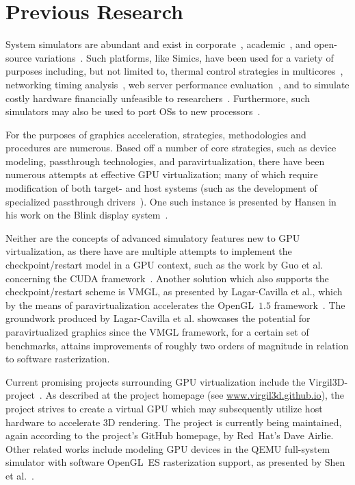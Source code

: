 
\section{Previous Research}
\label{sec:previousresearch}

System simulators are abundant and exist in corporate~, academic~, and open-source variations~.
Such platforms, like Simics, have been used for a variety of purposes including, but not limited to, thermal control strategies in multicores~, networking timing analysis~, web server performance evaluation~, and to simulate costly hardware financially unfeasible to researchers~.
Furthermore, such simulators may also be used to port OSs to new processors~.

For the purposes of graphics acceleration, strategies, methodologies and procedures are numerous.
Based off a number of core strategies, such as device modeling, passthrough technologies, and paravirtualization, there have been numerous attempts at effective GPU virtualization; many of which require modification of both target- and host systems (such as the development of specialized passthrough drivers~).
One such instance is presented by Hansen in his work on the Blink display system~.

Neither are the concepts of advanced simulatory features new to GPU virtualization, as there have are multiple attempts to implement the checkpoint/restart model in a GPU context, such as the work by Guo et al. concerning the CUDA framework~.
Another solution which also supports the checkpoint/restart scheme is VMGL, as presented by Lagar-Cavilla et al., which by the means of paravirtualization accelerates the OpenGL~$1.5$ framework~.
The groundwork produced by Lagar-Cavilla et al. showcases the potential for paravirtualized graphics since the VMGL framework, for a certain set of benchmarks, attains improvements of roughly two orders of magnitude in relation to software rasterization.

Current promising projects surrounding GPU virtualization include the Virgil3D-project~.
As described at the project homepage (see \href{http://virgil3d.github.io/}{www.virgil3d.github.io}), the project strives to create a virtual GPU which may subsequently utilize host hardware to accelerate 3D rendering.
The project is currently being maintained, again according to the project's GitHub homepage, by Red~Hat's Dave Airlie.
Other related works include modeling GPU devices in the QEMU full-system simulator with software OpenGL~ES rasterization support, as presented by Shen et al.~.


